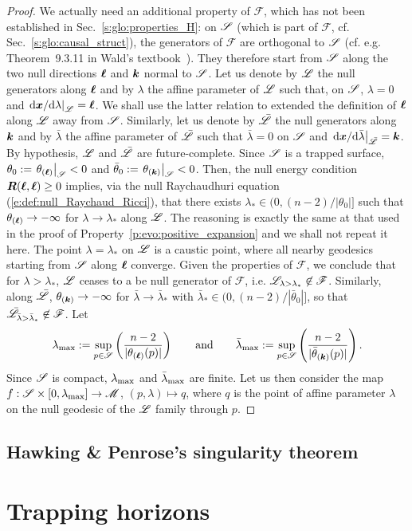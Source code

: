 \begin{proof}
We actually need an additional property of $\mathscr{F}$,
which has not been established in Sec.~\ref{s:glo:properties_H}:
on  $\mathscr{S}$ (which is part of $\mathscr{F}$, cf. Sec.~\ref{s:glo:causal_struct}),
the generators of $\mathscr{F}$ are orthogonal to $\mathscr{S}$ (cf. e.g. Theorem~9.3.11
in Wald's textbook~\cite{Wald84}). They therefore start from $\mathscr{S}$ along
the two null directions $\bm{\ell}$ and $\bm{k}$ normal to $\mathscr{S}$. Let us denote by $\mathscr{L}$ the null
generators along $\bm{\ell}$ and by $\lambda$ the affine parameter of $\mathscr{L}$
such that, on $\mathscr{S}$, $\lambda = 0$ and $\left. \mathrm{d}\bm{x}/\mathrm{d}\lambda\right| _{\mathscr{L}} = \bm{\ell}$. We shall use
the latter relation to extended the definition of $\bm{\ell}$ along $\mathscr{L}$
away from $\mathscr{S}$. Similarly, let us denote by $\bar{\mathscr{L}}$ the null
generators along $\bm{k}$ and by $\bar\lambda$ the affine parameter of $\bar{\mathscr{L}}$
such that $\bar\lambda = 0$ on $\mathscr{S}$ and
$\left. \mathrm{d}\bm{x}/\mathrm{d}\bar\lambda \right| _{\bar{\mathscr{L}}}= \bm{k}$.
By hypothesis, $\mathscr{L}$ and $\bar{\mathscr{L}}$ are future-complete.
Since $\mathscr{S}$ is a trapped surface, $\theta_0 := \left. \theta_{(\bm{\ell})} \right| _{\mathscr{S}} < 0$
and $\bar\theta_0 := \left. \theta_{(\bm{k})} \right|_{\mathscr{S}}<0$.
Then, the null energy condition $\bm{R}(\bm{\ell},\bm{\ell}) \geq 0$ implies, via the
null Raychaudhuri equation
(\ref{e:def:null_Raychaud_Ricci}), that there exists $\lambda_* \in (0, (n-2)/|\theta_0|]$
such that $\theta_{(\bm{\ell})} \to -\infty$ for $\lambda\to \lambda_*$ along $\mathscr{L}$.
The reasoning is exactly the same at that used in the proof of
Property~\ref{p:evo:positive_expansion} and we shall
not repeat it here. The point $\lambda=\lambda_*$ on $\mathscr{L}$ is a caustic point,
where all nearby geodesics starting from $\mathscr{S}$ along $\bm{\ell}$ converge.
Given the properties of $\mathscr{F}$, we conclude that for $\lambda > \lambda_*$, $\mathscr{L}$
ceases to a be null generator of $\mathscr{F}$, i.e.
$\mathscr{L}_{\lambda > \lambda_*} \not\in \mathscr{F}$.
Similarly, along $\bar{\mathscr{L}}$,
$\theta_{(\bm{k})} \to -\infty$ for $\bar\lambda\to \bar\lambda_*$
with $\bar\lambda_* \in (0, (n-2)/|\bar\theta_0|]$, so that
$\bar{\mathscr{L}}_{\bar\lambda > \bar\lambda_*} \not\in \mathscr{F}$.
Let
\[
    \lambda_{\rm max} := \sup_{p\in\mathscr{S}} \left(  \frac{n-2}{|\theta_{(\bm{\ell})} (p)|} \right)
    \qquad\mbox{and}\qquad
    \bar\lambda_{\rm max} := \sup_{p\in\mathscr{S}} \left(  \frac{n-2}{|\bar\theta_{(\bm{k})}(p)|} \right)    .
\]
Since $\mathscr{S}$ is compact, $\lambda_{\rm max}$ and $\bar\lambda_{\rm max}$ are finite.
Let us then consider the map $f: \mathscr{S} \times [0,\lambda_{\rm max}] \to \mathscr{M}$,
$(p,\lambda) \mapsto q$, where $q$ is the point of affine parameter $\lambda$
on the null geodesic of the $\mathscr{L}$ family through $p$.

\end{proof}

\subsection{Hawking \& Penrose's singularity theorem}



\section{Trapping horizons}


